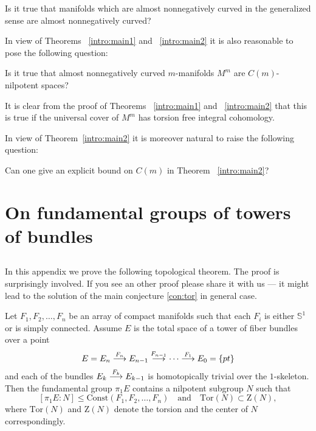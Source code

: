 \documentclass{amsart}
\begin{document}
\begin{quest}
Is it true  that  manifolds which are almost nonnegatively curved in the generalized sense
are almost nonnegatively curved?
\end{quest}


In view of Theorems ~\ref{intro:main1} and ~\ref{intro:main2} it is
also reasonable to pose the following question:

\begin{quest}
Is it true that almost nonnegatively curved $m$-manifolds $M^m$
are $C(m)$-nilpotent spaces?
\end{quest}

It is clear from the proof of Theorems ~\ref{intro:main1} and ~\ref{intro:main2}
that this is true if the universal cover
of $M^m$ has torsion free integral cohomology.

In view of Theorem~\ref{intro:main2} it is moreover natural to raise
the following question:
\begin{quest}
Can one give an explicit bound on $C(m)$ in Theorem ~\ref{intro:main2}?
\end{quest}

\appendix
\section{On fundamental groups of towers of bundles}

\subsection{}
In this appendix we prove the following topological theorem.
The proof is surprisingly involved.
If you see an other proof please share it with us --- it might lead to the solution of the main conjecture \ref{con:tor} in general case.

\begin{thm}\label{thm:top}
Let $F_1,F_2,\dots,F_n$ be an array of compact manifolds 
such that each $F_i$ is either $\mathbb{S}^{1}$ or is simply connected. 
Assume $E$ is the total space of a tower of fiber bundles over a point
$$E=E_n\buildrel {F_n}\over \longrightarrow E_{n-1}\buildrel {F_{n-1}}\over\longrightarrow\dots\buildrel {F_1}\over\longrightarrow E_0=\{pt\}$$
and each of the bundles $E_k\buildrel {F_k}\over \longrightarrow E_{k-1}$ is homotopically trivial over the $1$-skeleton. 
Then the fundamental group $\pi_1E$ contains a nilpotent subgroup $N$ such that
$$[\pi_1E:N]\le \mathrm{Const}(F_1,F_2,\dots,F_n)\quad\text{and}\quad\mathrm{Tor}(N)\subset \mathrm{Z}(N),$$
where $\mathrm{Tor}(N)$ and $\mathrm{Z}(N)$ denote the torsion and the center of $N$ correspondingly.
\end{thm}
\end{document}
